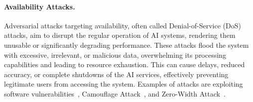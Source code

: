 \paragraph{Availability Attacks.}
Adversarial attacks targeting availability, often called Denial-of-Service (DoS) attacks, aim to disrupt the regular operation of AI systems, rendering them unusable or significantly degrading performance.
These attacks flood the system with excessive, irrelevant, or malicious data, overwhelming its processing capabilities and leading to resource exhaustion.
This can cause delays, reduced accuracy, or complete shutdowns of the AI services, effectively preventing legitimate users from accessing the system.
Examples of attacks are exploiting software vulnerabilities~\cite{xiao2018security}, Camouflage Attack~\cite{xiao2019seeing}, and Zero-Width Attack~\cite{pajola2021fall}.

